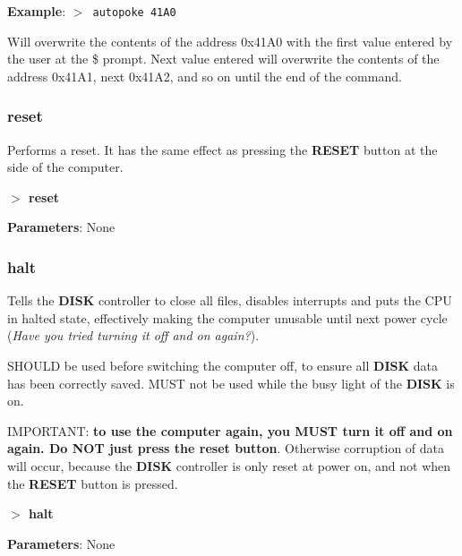 \documentclass[a4paper,11pt]{article}
\begin{document}
        \textbf{Example}: \texttt{$>$ autopoke 41A0}

        Will overwrite the contents of the address 0x41A0 with the first
        value entered by the user at the \$ prompt. Next value entered will
        overwrite the contents of the address 0x41A1, next 0x41A2, and so on
        until the end of the command.

        \subsubsection{{\color{blue}reset}}
        Performs a reset. It has the same effect as pressing the
        \textbf{RESET} button at the side of the computer.

        \hspace{1.9cm}\textbf{$>$ reset}

        \textbf{Parameters}: None

        \subsubsection{{\color{blue}halt}}
        Tells the \textbf{DISK} controller to close all files, disables
        interrupts and puts the CPU in halted state, effectively making the
        computer unusable until next power cycle (\textit{Have you tried turning
        it off and on again?}).

        SHOULD be used before switching the computer off, to ensure all
        \textbf{DISK} data has been correctly saved. MUST not be used while the
        busy light of the \textbf{DISK} is on.

        IMPORTANT: \textbf{to use the computer again, you MUST turn it off and
        on again. Do NOT just press the reset button}. Otherwise corruption of
        data will occur, because the \textbf{DISK} controller is only reset at
        power on, and not when the \textbf{RESET} button is pressed.

        \hspace{1.9cm}\textbf{$>$ halt}

        \textbf{Parameters}: None

\end{document}
